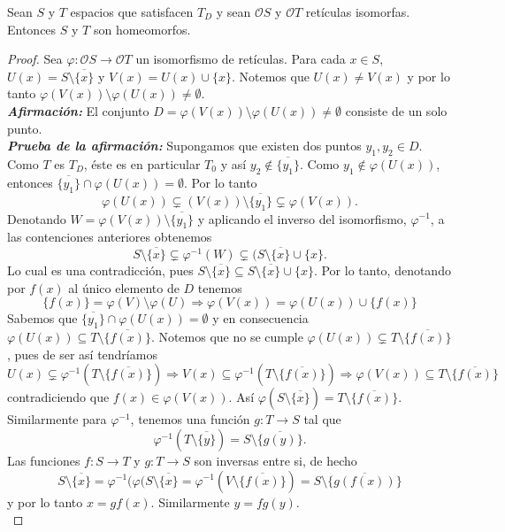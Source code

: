 \documentclass{comunicaciones}
\begin{document}
\begin{thm}
    Sean $S$ y $T$ espacios que satisfacen $T_D$ y sean $\mathcal{O}S$ y $\mathcal{O}T$ retículas isomorfas. Entonces $S$ y $T$ son homeomorfos.  
\end{thm}

\begin{proof}
    Sea $\varphi\colon \mathcal{O}S\to \mathcal{O}T$ un isomorfismo de retículas. Para cada $x\in S$, $U(x)=S\setminus \overline{\{x\}}$ y $V(x)=U(x)\cup \{x\}$. Notemos que $U(x)\neq V(x)$ y por lo tanto $\varphi(V(x))\setminus \varphi(U(x))\neq\emptyset$.\\

    \noindent
    \emph{\textbf{Afirmación:}} El conjunto $D=\varphi(V(x))\setminus \varphi(U(x))\neq\emptyset$ consiste de un solo punto.\\

    \noindent
    \emph{\textbf{Prueba de la afirmación:}} Supongamos que existen dos puntos $y_1, y_2\in D$. Como $T$ es $T_D$, éste es en particular $T_0$ y así $y_2\notin \overline{\{y_1\}}$. Como $y_1\notin \varphi(U(x))$, entonces $\overline{\{y_1\}}\cap \varphi(U(x))=\emptyset$. Por lo tanto 
    \[
    \varphi(U(x))\varsubsetneq (V(x))\setminus\overline{\{y_1\}}\varsubsetneq \varphi(V(x)).
    \]
    Denotando $W=\varphi(V(x))\setminus\overline{\{y_1\}}$ y aplicando el inverso del isomorfismo, $\varphi^{-1}$, a las contenciones anteriores obtenemos
    \[
    S\setminus\overline{\{x\}}\varsubsetneq \varphi^{-1}(W)\varsubsetneq (S\setminus\overline{\{x\}}\cup\{x\}.
    \]
    Lo cual es una contradicción, pues $S\setminus\overline{\{x\}}\subseteq S\setminus\overline{\{x\}}\cup\{x\}$. Por lo tanto, denotando por $f(x)$ al único elemento de $D$ tenemos 
    \[
    \{f(x)\}=\varphi(V)\setminus\varphi(U)\Rightarrow \varphi(V(x))=\varphi(U(x))\cup\{f(x)\}
    \]
    Sabemos que $\overline{\{y_1\}}\cap \varphi(U(x))=\emptyset$ y en consecuencia $\varphi(U(x))\subseteq T\setminus \overline{\{f(x)\}}$. Notemos que no se cumple $\varphi(U(x))\varsubsetneq T\setminus \overline{\{f(x)\}}$, pues de ser así tendríamos 
    \[
    U(x)\varsubsetneq \varphi^{-1}(T\setminus\overline{\{f(x)\}})\Rightarrow V(x)\subseteq \varphi^{-1}(T\setminus\overline{\{f(x)\}})\Rightarrow \varphi(V(x))\subseteq T\setminus\overline{\{f(x)\}}
    \]
    contradiciendo que $f(x)\in \varphi(V(x))$. Así $\varphi(S\setminus \overline{\{x\}})=T\setminus\overline{\{f(x)\}}$.\\

    \noindent
    Similarmente para $\varphi^{-1}$, tenemos una función $g\colon T\to S$ tal que 
    \[
    \varphi^{-1}(T\setminus\overline{\{y\}})=S\setminus\overline{\{g(y)\}}.
    \]
    Las funciones $f\colon S\to T$ y $g\colon T\to S$ son inversas entre si, de hecho 
    \[
    S\setminus\overline{\{x\}}=\varphi^{-1}(\varphi(S\setminus\overline{\{x\}}=\varphi^{-1}(V\setminus\overline{\{f(x)\}})=S\setminus\overline{\{g(f(x))\}}
    \]
    y por lo tanto $x=gf(x)$. Similarmente $y=fg(y)$.\\  


\end{proof}
\end{document}
